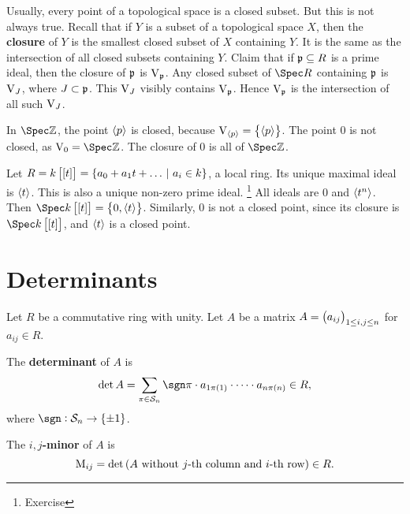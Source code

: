 Usually, every point of a topological space is a closed subset. But this is not always true. Recall that if $ Y $ is a subset of a topological space $ X $, then the \textbf{closure} of $ Y $ is the smallest closed subset of $ X $ containing $ Y $. It is the same as the intersection of all closed subsets containing $ Y $. Claim that if $ \mathfrak{p} \subseteq R $ is a prime ideal, then the closure of $ \mathfrak{p} $ is $ \mathrm{V}_{\mathfrak{p}} $. Any closed subset of $ \Spec R $ containing $ \mathfrak{p} $ is $ \mathrm{V}_J $, where $ J \subset \mathfrak{p} $. This $ \mathrm{V}_J $ visibly contains $ \mathrm{V}_{\mathfrak{p}} $. Hence $ \mathrm{V}_{\mathfrak{p}} $ is the intersection of all such $ \mathrm{V}_J $.

\begin{example*}
In $ \Spec \ZZ $, the point $ \left\langle p \right\rangle $ is closed, because $ \V_{\abr{p}} = \cbr{\abr{p}} $. The point $ 0 $ is not closed, as $ \V_{0} = \Spec \ZZ $. The closure of $ 0 $ is all of $ \Spec \ZZ $.
\end{example*}

\begin{example*}
Let $ R = k\sbr{\sbr{t}} = \cbr{a_0 + a_1t + \dots \st a_i \in k} $, a local ring. Its unique maximal ideal is $ \left\langle t \right\rangle $. This is also a unique non-zero prime ideal. \footnote{Exercise} All ideals are $ 0 $ and $ \left\langle t^n \right\rangle $. Then $ \Spec k\sbr{\sbr{t}} = \cbr{0, \abr{t}} $. Similarly, $ 0 $ is not a closed point, since its closure is $ \Spec k\sbr{\sbr{t}} $, and $ \left\langle t \right\rangle $ is a closed point.
\end{example*}

\pagebreak

\section{Determinants}


Let $ R $ be a commutative ring with unity. Let $ A $ be a matrix $ A = \br{a_{ij}}_{1 \le i, j \le n} $ for $ a_{ij} \in R $.

\begin{definition}
The \textbf{determinant} of $ A $ is
$$ \det A = \sum_{\pi \in \SSS_n} \sgn \pi \cdot a_{1\pi\br{1}} \cdot \dots \cdot a_{n\pi\br{n}} \in R, $$
where $ \sgn : \SSS_n \to \cbr{\pm 1} $.
\end{definition}

\begin{definition}
The \textbf{$ i, j $-minor} of $ A $ is
$$ \M_{ij} = \det\br{A \ \text{without $ j $-th column and $ i $-th row}} \in R. $$
\end{definition}

